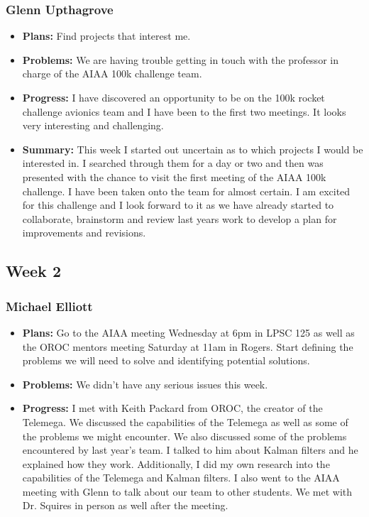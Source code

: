 \documentclass[onecolumn, draftclsnofoot,10pt, compsoc]{IEEEtran}
\begin{document}
\subsubsection{Glenn Upthagrove}
\begin {itemize}
 \item \textbf{Plans: }Find projects that interest me. 
 \item \textbf{Problems: }We are having trouble getting in touch with the professor in charge of the AIAA 100k challenge team. 
 \item \textbf{Progress: }I have discovered an opportunity to be on the 100k rocket challenge avionics team and I have been to the first two meetings. It looks very interesting and challenging.  
 \item \textbf{Summary: }This week I started out uncertain as to which projects I would be interested in. I searched through them for a day or two and then was presented with the chance to visit the first meeting of the AIAA 100k challenge. I have been taken onto the team for almost certain. I am excited for this challenge and I look forward to it as we have already started to collaborate, brainstorm and review last years work to develop a plan for improvements and revisions.  
\end {itemize}
\subsection {Week 2}
\subsubsection{Michael Elliott}
\begin {itemize}
\item \textbf{Plans: }
  Go to the AIAA meeting Wednesday at 6pm in LPSC 125 as well as the OROC mentors meeting Saturday at 11am in Rogers. Start defining the problems we will need to solve and identifying potential solutions.
\item \textbf{Problems: }
  We didn't have any serious issues this week.
\item \textbf{Progress: }
  I met with Keith Packard from OROC, the creator of the Telemega. We discussed the capabilities of the Telemega as well as some of the problems we might encounter. We also discussed some of the problems encountered by last year's team. I talked to him about Kalman filters and he explained how they work. Additionally, I did my own research into the capabilities of the Telemega and Kalman filters. I also went to the AIAA meeting with Glenn to talk about our team to other students. We met with Dr. Squires in person as well after the meeting.
\end {itemize}
\end{document}
